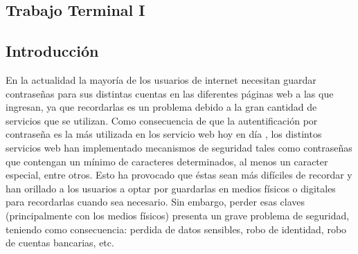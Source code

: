 \documentclass[12pt, a4paper, titlepage]{report}
\begin{document}
	\begin{appendix}
		\renewcommand*\contentsname{{\textcolor{azulescom}{Índice.}}}
		\tableofcontents
		\newpage
		\renewcommand*\listfigurename{{\textcolor{azulescom}{Índice de figuras.}}}
		\listoffigures
		\newpage
		\newpage
		\renewcommand*\listtablename{{\textcolor{azulescom}{Índice de cuadros.}}}
		\listoftables
		
		\newpage
		\renewcommand*\glossaryname{{\textcolor{azulescom}{Glosario.}}}
		
		\printglossary
	\end{appendix}
	
    \textcolor{guindapoli}{\part{Trabajo Terminal I}}
    
    \renewcommand\thechapter{\arabic{chapter}}
    \renewcommand{\appendixname}{Capítulo}
    \chapter{\textcolor{azulescom}{Introducción}}

	\renewcommand\thesection{\arabic{section}}	
		
		En la actualidad la mayor\'ia de los usuarios de internet necesitan guardar contraseñas para sus distintas cuentas en las diferentes páginas web a las que ingresan, ya que recordarlas es un problema debido a la gran cantidad de servicios que se utilizan. Como consecuencia de que la autentificaci\'on por contraseña es la más utilizada en los servicio web hoy en día \cite{ComparisonAuthenticationMethodsResources}, los distintos servicios web han implementado mecanismos de seguridad tales como contraseñas que contengan un mínimo de caracteres determinados, al menos un caracter especial, entre otros. Esto ha provocado que éstas sean más difíciles de recordar y han orillado a los usuarios a optar por guardarlas en medios físicos o digitales para recordarlas cuando sea necesario. 
		Sin embargo, perder esas claves (principalmente con los medios físicos) presenta un grave problema de seguridad, teniendo como consecuencia: perdida de datos sensibles, robo de identidad, robo de cuentas bancarias, etc.\\
		
\end{document}
